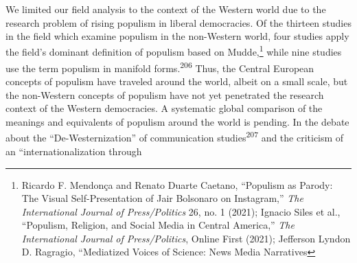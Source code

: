 \documentclass{tufte-handout}
\begin{document}
{{{{We limited our field analysis to the context of the Western world due to
the research problem of rising populism in liberal democracies. Of the
thirteen studies in the field which examine populism in the non-Western
world, four studies apply the field's dominant definition of populism
based on Mudde,\footnote{Ricardo F. Mendonça and Renato Duarte Caetano,
  ``Populism as Parody: The Visual Self-Presentation of Jair Bolsonaro
  on Instagram,'' \emph{The International Journal of Press/Politics} 26,
  no. 1 (2021); Ignacio Siles et al., ``Populism, Religion, and Social
  Media in Central America,'' \emph{The International Journal of
  Press/Politics}, Online First (2021); Jefferson Lyndon D. Ragragio,
  ``Mediatized Voices of Science: News Media Narratives} while nine studies
use the term populism in manifold forms.\textsuperscript{206} Thus, the Central European concepts of
populism have traveled around the world, albeit on a small scale, but
the non-Western concepts of populism have not yet penetrated the
research context of the Western democracies. A systematic global
comparison of the meanings and equivalents of populism around the world
is pending. In the debate about the ``De-Westernization'' of
communication studies\textsuperscript{207} and the criticism of an
``internationalization through}}}}
\end{document}
